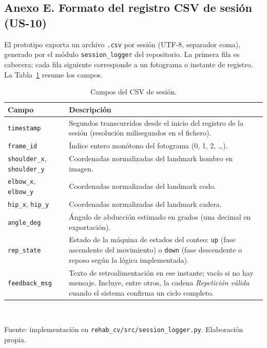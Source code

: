 \documentclass[11pt,a4paper]{article}
\renewcommand{\arraystretch}{1.35}
\begin{document}
\subsection*{Anexo E. Formato del registro CSV de sesión (US-10)}
\label{anexo:csv-sesion}
El prototipo exporta un archivo \texttt{.csv} por sesión (UTF-8, separador coma), generado por el módulo \texttt{session\_logger} del repositorio. La primera fila es cabecera; cada fila siguiente corresponde a un fotograma o instante de registro. La Tabla~\ref{tab:csv-columnas} resume los campos.

\begin{table}[htbp]
\caption{Campos del CSV de sesión.}
\label{tab:csv-columnas}
\footnotesize
\centering
\renewcommand{\arraystretch}{1.2}
\begin{tabular}{@{}p{2.6cm}p{9.8cm}@{}}
\toprule
Campo & Descripción \\
\midrule
\texttt{timestamp} & Segundos transcurridos desde el inicio del registro de la sesión (resolución milisegundos en el fichero). \\
\texttt{frame\_id} & Índice entero monótono del fotograma (0, 1, 2, \ldots). \\
\texttt{shoulder\_x}, \texttt{shoulder\_y} & Coordenadas normalizadas del landmark hombro en imagen. \\
\texttt{elbow\_x}, \texttt{elbow\_y} & Coordenadas normalizadas del landmark codo. \\
\texttt{hip\_x}, \texttt{hip\_y} & Coordenadas normalizadas del landmark cadera. \\
\texttt{angle\_deg} & Ángulo de abducción estimado en grados (una decimal en exportación). \\
\texttt{rep\_state} & Estado de la máquina de estados del conteo: \texttt{up} (fase ascendente del movimiento) o \texttt{down} (fase descendente o reposo según la lógica implementada). \\
\texttt{feedback\_msg} & Texto de retroalimentación en ese instante; vacío si no hay mensaje. Incluye, entre otros, la cadena \textit{Repetición válida} cuando el sistema confirma un ciclo completo. \\
\bottomrule
\end{tabular}\\
\renewcommand{\arraystretch}{1.35}
\vspace{4pt}
\raggedright\footnotesize Fuente: implementación en \texttt{rehab\_cv/src/session\_logger.py}. Elaboración propia.
\end{table}
\end{document}
